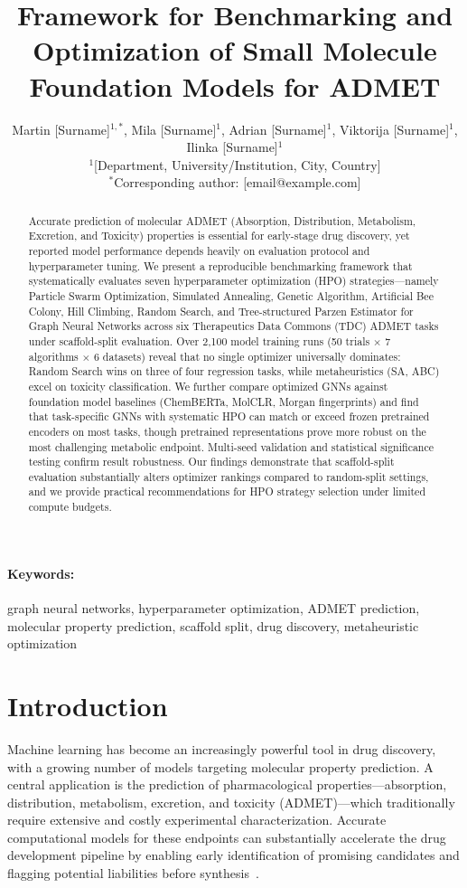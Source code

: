 \documentclass[12pt]{article}
\title{Framework for Benchmarking and Optimization of Small Molecule Foundation Models for ADMET}
\author{
  Martin [Surname]$^{1,*}$, Mila [Surname]$^{1}$, Adrian [Surname]$^{1}$,
  Viktorija [Surname]$^{1}$, Ilinka [Surname]$^{1}$ \\[6pt]
  \small $^{1}$[Department, University/Institution, City, Country] \\
  \small $^{*}$Corresponding author: [email@example.com]
}
\date{}
\begin{document}
\maketitle

\begin{abstract}
Accurate prediction of molecular ADMET (Absorption, Distribution, Metabolism, Excretion, and Toxicity) properties is essential for early-stage drug discovery, yet reported model performance depends heavily on evaluation protocol and hyperparameter tuning. We present a reproducible benchmarking framework that systematically evaluates seven hyperparameter optimization (HPO) strategies---namely Particle Swarm Optimization, Simulated Annealing, Genetic Algorithm, Artificial Bee Colony, Hill Climbing, Random Search, and Tree-structured Parzen Estimator for Graph Neural Networks across six Therapeutics Data Commons (TDC) ADMET tasks under scaffold-split evaluation. Over 2{,}100 model training runs (50 trials $\times$ 7 algorithms $\times$ 6 datasets) reveal that no single optimizer universally dominates: Random Search wins on three of four regression tasks, while metaheuristics (SA, ABC) excel on toxicity classification. We further compare optimized GNNs against foundation model baselines (ChemBERTa, MolCLR, Morgan fingerprints) and find that task-specific GNNs with systematic HPO can match or exceed frozen pretrained encoders on most tasks, though pretrained representations prove more robust on the most challenging metabolic endpoint. Multi-seed validation and statistical significance testing confirm result robustness. Our findings demonstrate that scaffold-split evaluation substantially alters optimizer rankings compared to random-split settings, and we provide practical recommendations for HPO strategy selection under limited compute budgets.
\end{abstract}

\paragraph*{Keywords:} graph neural networks, hyperparameter optimization, ADMET prediction, molecular property prediction, scaffold split, drug discovery, metaheuristic optimization

\section{Introduction}

Machine learning has become an increasingly powerful tool in drug discovery, with a growing number of models targeting molecular property prediction. A central application is the prediction of pharmacological properties---absorption, distribution, metabolism, excretion, and toxicity (ADMET)---which traditionally require extensive and costly experimental characterization. Accurate computational models for these endpoints can substantially accelerate the drug development pipeline by enabling early identification of promising candidates and flagging potential liabilities before synthesis~\cite{zhang2025admet}.
\end{document}
